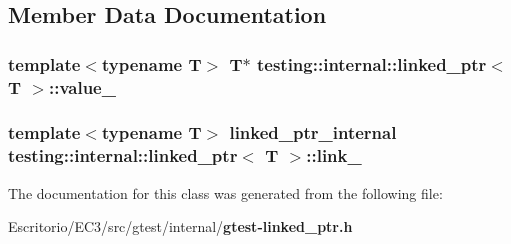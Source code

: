 \subsection{Member Data Documentation}
\subsubsection{\setlength{\rightskip}{0pt plus 5cm}template$<$typename T$>$ T$\ast$ {\bf testing::internal::linked\_\-ptr}$<$ T $>$::{\bf value\_\-}\hspace{0.3cm}{\tt  [private]}}\label{classtesting_1_1internal_1_1linked__ptr_2bd820d72c6e913a5a3dcc076b06f47f}


\subsubsection{\setlength{\rightskip}{0pt plus 5cm}template$<$typename T$>$ {\bf linked\_\-ptr\_\-internal} {\bf testing::internal::linked\_\-ptr}$<$ T $>$::{\bf link\_\-}\hspace{0.3cm}{\tt  [private]}}\label{classtesting_1_1internal_1_1linked__ptr_2c970516b35e03f2103f8bab1bc6db7e}




The documentation for this class was generated from the following file:\begin{CompactItemize}
\item 
Escritorio/EC3/src/gtest/internal/{\bf gtest-linked\_\-ptr.h}\end{CompactItemize}
